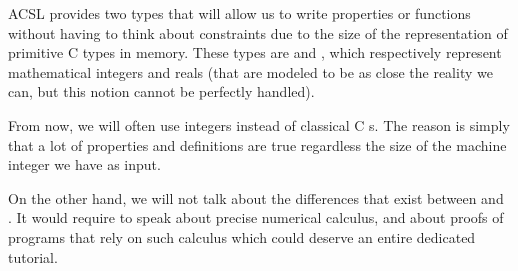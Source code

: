 ACSL provides two types that will allow us to write properties or
functions without having to think about constraints due to the size of
the representation of primitive C types in memory. These types are
 and , which respectively represent
mathematical integers and reals (that are modeled to be as close the
reality we can, but this notion cannot be perfectly handled).

From now, we will often use integers instead of classical C
s. The reason is simply that a lot of properties and
definitions are true regardless the size of the machine integer we have
as input.

On the other hand, we will not talk about the differences that exist
between  and . It would require to
speak about precise numerical calculus, and about proofs of programs
that rely on such calculus which could deserve an entire dedicated
tutorial.
